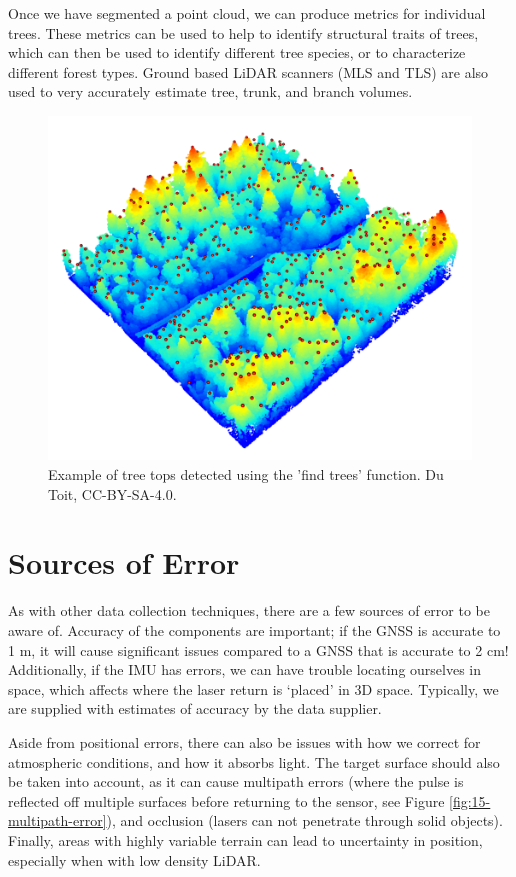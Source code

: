 \documentclass[
]{book}
\begin{document}
Once we have segmented a point cloud, we can produce metrics for individual trees. These metrics can be used to help to identify structural traits of trees, which can then be used to identify different tree species, or to characterize different forest types. Ground based LiDAR scanners (MLS and TLS) are also used to very accurately estimate tree, trunk, and branch volumes.

\begin{figure}
\includegraphics[width=0.8\linewidth]{images/15-las-treetops} \caption{Example of tree tops detected using the 'find trees' function. Du Toit, CC-BY-SA-4.0.}\label{fig:15-las-treetops}
\end{figure}

\section{Sources of Error}\label{sources-of-error-1}

As with other data collection techniques, there are a few sources of error to be aware of. Accuracy of the components are important; if the GNSS is accurate to 1 m, it will cause significant issues compared to a GNSS that is accurate to 2 cm! Additionally, if the IMU has errors, we can have trouble locating ourselves in space, which affects where the laser return is `placed' in 3D space. Typically, we are supplied with estimates of accuracy by the data supplier.

Aside from positional errors, there can also be issues with how we correct for atmospheric conditions, and how it absorbs light. The target surface should also be taken into account, as it can cause multipath errors (where the pulse is reflected off multiple surfaces before returning to the sensor, see Figure \ref{fig:15-multipath-error}), and occlusion (lasers can not penetrate through solid objects). Finally, areas with highly variable terrain can lead to uncertainty in position, especially when with low density LiDAR.
\end{document}
